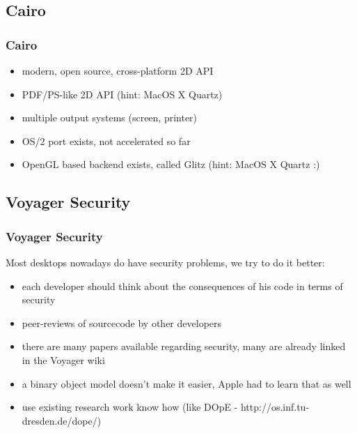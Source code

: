 \documentclass[handout]{beamer}
\begin{document}
\subsection{Cairo}
\begin{frame}
\frametitle{Cairo}
	\begin{itemize}
		\item modern, open source, cross-platform 2D API
		\item PDF/PS-like 2D API (hint: MacOS X Quartz)
		\item multiple output systems (screen, printer)
		\item OS/2 port exists, not accelerated so far
		\item OpenGL based backend exists, called Glitz (hint: MacOS X Quartz :)
	\end{itemize}
\end{frame}

\subsection{Voyager Security}
\begin{frame}
\frametitle{Voyager Security}
	Most desktops nowadays do have security problems, we try to do it better:
	\begin{itemize}
      \item each developer should think about the consequences of his code in terms of security
      \item peer-reviews of sourcecode by other developers
      \item there are many papers available regarding security, many are already linked in the Voyager wiki
      \item a binary object model doesn't make it easier, Apple had to learn that as well
      \item use existing research work know how (like DOpE - http://os.inf.tu-dresden.de/dope/)
	\end{itemize}
\end{frame}
\end{document}
